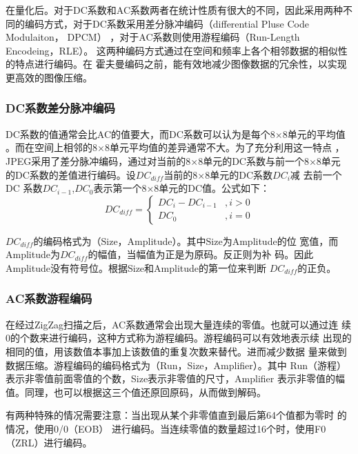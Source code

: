 \documentclass{article}
\numberwithin {equation}{section}
\begin{document}
\begin{spacing}{1.25}
    在量化后。对于DC系数和AC系数两者在统计性质有很大的不同，因此采用两种不
    同的编码方式，对于DC系数采用差分脉冲编码（differential Pluse Code Modulaiton， DPCM）
    ，对于AC系数则使用游程编码（Run-Length Encodeing，RLE）。
    这两种编码方式通过在空间和频率上各个相邻数据的相似性的特点进行编码。在
    霍夫曼编码之前，能有效地减少图像数据的冗余性，以实现更高效的图像压缩。
    \subsubsection{DC系数差分脉冲编码}
    \vspace{1em}
      DC系数的值通常会比AC的值要大，而DC系数可以认为是每个8×8单元的平均值
      。而在空间上相邻的8×8单元平均值的差异通常不大。为了充分利用这一特点
      ，JPEG采用了差分脉冲编码，通过对当前的8×8单元的DC系数与前一个8×8单元
      的DC系数的差值进行编码。设$DC_{diff}$当前的8×8单元的DC系数$DC_{i}$减
      去前一个DC
      系数$DC_{i-1}$,$DC_{0}$表示第一个8×8单元的DC值。公式如下：
      \begin{equation}
        DC_{diff}=\begin{cases}
          DC_{i}-DC_{i-1} &,i>0\\
          DC_{0}&,i=0
        \end{cases}
      \end{equation}

      $DC_{diff}$的编码格式为（Size，Amplitude）。其中Size为Amplitude的位
      宽值，而Amplitude为$DC_{diff}$的幅值，当幅值为正是为原码。反正则为补
      码。因此Amplitude没有符号位。根据Size和Amplitude的第一位来判断
      $DC_{diff}$的正负。
    \subsubsection{AC系数游程编码}
      \vspace{1em}
      在经过ZigZag扫描之后，AC系数通常会出现大量连续的零值。也就可以通过连
      续0的个数来进行编码，这种方式称为游程编码。游程编码可以有效地表示续
      出现的相同的值，用该数值本事加上该数值的重复次数来替代。进而减少数据
      量来做到数据压缩。游程编码的编码格式为（Run，Size，Amplifier）。其中
      Run（游程）表示非零值前面零值的个数，Size表示非零值的尺寸，Amplifier      表示非零值的幅值。同理，也可以根据这三个值还原回原码，从而做到解码。

      有两种特殊的情况需要注意：当出现从某个非零值直到最后第64个值都为零时
      的情况，使用0/0（EOB）
      进行编码。当连续零值的数量超过16个时，使用F0（ZRL）进行编码。

\end{spacing}
\end{document}

